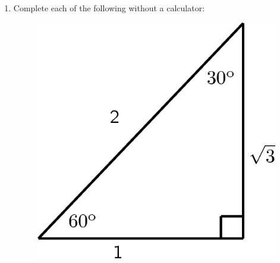 \begin{enumerate}[noitemsep, label=\textbf{\arabic*}. ]
{\begin{minipage}{\columnwidth}
{    (14.7)}
    \end{minipage}\vspace{12pt}\par
    }%
    \label{m39408*uid24}\item Complete each of the following without a calculator:
    \setcounter{subfigure}{0}
	\begin{figure}[H] %
    \begin{center}
    \label{m39408*id80508!!!underscore!!!media}\label{m39408*id80508!!!underscore!!!printimage}\includegraphics{col11306.imgs/m39408_MG10C15_006.png} %
      \vspace{2pt}
    \vspace{.1in}
    \end{center}
 \end{figure}       \label{m39408*id80519}\nopagebreak\noindent{}
\end{enumerate}
